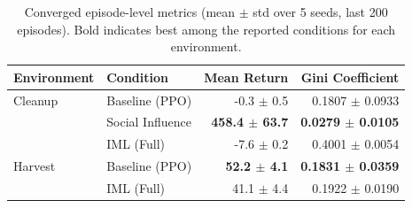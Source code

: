 \begin{table}[htbp]
\caption{Converged episode-level metrics (mean $\pm$ std over 5 seeds, last 200 episodes). Bold indicates best among the reported conditions for each environment.}
\label{tab:episode_metrics}
\centering
\footnotesize
\begin{tabular}{llrr}
\toprule
\textbf{Environment} & \textbf{Condition} & \textbf{Mean Return} & \textbf{Gini Coefficient} \\
\midrule
  Cleanup & Baseline (PPO) & -0.3 $\pm$ 0.5 & 0.1807 $\pm$ 0.0933 \\
   & Social Influence & \textbf{458.4 $\pm$ 63.7} & \textbf{0.0279 $\pm$ 0.0105} \\
   & IML (Full) & -7.6 $\pm$ 0.2 & 0.4001 $\pm$ 0.0054 \\
\midrule
  Harvest & Baseline (PPO) & \textbf{52.2 $\pm$ 4.1} & \textbf{0.1831 $\pm$ 0.0359} \\
   & IML (Full) & 41.1 $\pm$ 4.4 & 0.1922 $\pm$ 0.0190 \\
\bottomrule
\end{tabular}
\end{table}
